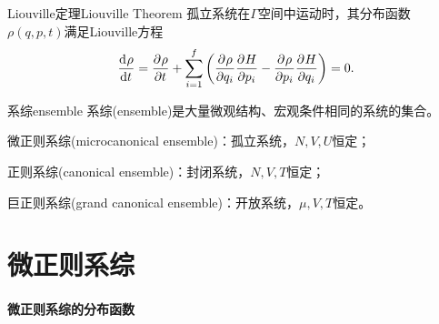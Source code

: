 \begin{theorem}
	{Liouville定理}{Liouville Theorem}
	孤立系统在$\varGamma$空间中运动时，其分布函数$\rho(q,p,t)$满足Liouville方程
	\begin{equation}
		\frac{\mathrm{d}^{{}}\rho}{\mathrm{d}{t}^{{}}}=\frac{\partial^{{}}\rho}{\partial{t}^{{}}}+\sum_{i=1}^f\left(\frac{\partial^{{}}\rho}{\partial{q_i}^{{}}}\frac{\partial^{{}}H}{\partial{p_i}^{{}}}-\frac{\partial^{{}}\rho}{\partial{p_i}^{{}}}\frac{\partial^{{}}H}{\partial{q_i}^{{}}}\right)=0.
	\end{equation}
\end{theorem}



\begin{definition}{系综}{ensemble}
	系综(ensemble)是大量微观结构、宏观条件相同的系统的集合。
	\begin{compactitem}
		\item 微正则系综(microcanonical ensemble)：孤立系统，$N,V,U$恒定；
		\item 正则系综(canonical ensemble)：封闭系统，$N,V,T$恒定；
		\item 巨正则系综(grand canonical ensemble)：开放系统，$\mu,V,T$恒定。
	\end{compactitem}
\end{definition}

\section{微正则系综}
\label{sec:microcanonical}



\paragraph{微正则系综的分布函数}

